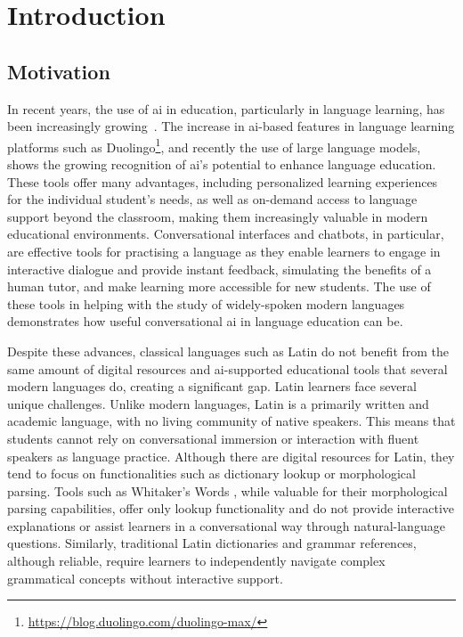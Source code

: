 \chapter{Introduction}%
\label{chp:introduction}

\section{Motivation}
\label{sec:motivation}

In recent years, the use of \gls{ai} in education, particularly 
in language learning, has been increasingly growing~\cite{d4db0c16}. 
The increase in \gls{ai}-based features in language learning 
platforms such as Duolingo\footnote{ \label{duolingo}
\url{https://blog.duolingo.com/duolingo-max/}}, 
and recently the use of large language models, shows the 
growing recognition of \gls{ai}'s potential to enhance language 
education. These tools offer many advantages, including 
personalized learning experiences for the individual student's 
needs, as well as on-demand access to language support beyond 
the classroom, making them increasingly valuable in modern 
educational environments. Conversational interfaces and 
chatbots, in particular, are effective tools for practising 
a language as they enable learners to engage in interactive 
dialogue and provide instant feedback, simulating the benefits 
of a human tutor, and make learning more accessible for new 
students. The use of these tools in helping with the study 
of widely-spoken modern languages demonstrates how useful 
conversational \gls{ai} in language education can be.

Despite these advances, classical languages such as Latin do 
not benefit from the same amount of digital resources and 
\gls{ai}-supported educational tools that several modern languages 
do, creating a significant gap. Latin learners face several 
unique challenges. Unlike modern languages, Latin is a 
primarily written and academic language, with no living 
community of native speakers. This means that students cannot 
rely on conversational immersion or interaction with fluent 
speakers as language practice. Although there are digital 
resources for Latin, they tend to focus on functionalities 
such as dictionary lookup or morphological parsing. Tools 
such as Whitaker's Words \cite{words}, while valuable for 
their morphological parsing capabilities, offer only lookup 
functionality and do not provide interactive explanations or 
assist learners in a conversational way through natural-language 
questions. Similarly, traditional Latin dictionaries and 
grammar references, although reliable, require learners to 
independently navigate complex grammatical concepts without 
interactive support.

